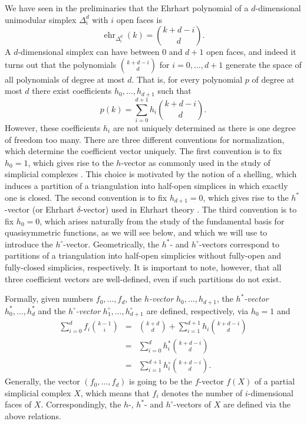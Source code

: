 \documentclass[12pt,reqno]{amsart}
\numberwithin{definition}{section}
\theoremstyle{definition}
\newcommand{\ehr}{\operatorname{ehr}}
\begin{document}
We have seen in the preliminaries that the Ehrhart polynomial of a $d$-dimensional unimodular simplex $\Delta^d_i$ with $i$ open faces is
\[
  \ehr_{\Delta^d_i}(k) = \binom{k+d-i}{d}.
\]
A $d$-dimensional simplex can have between 0 and $d+1$ open faces, and indeed it turns out that the polynomials $\binom{k+d-i}{d}$ for $i=0,\ldots,d+1$ generate the space of all polynomials of degree at most $d$. That is, for every polynomial $p$ of degree at most $d$ there exist coefficients $h_0,\ldots,h_{d+1}$ such that
\[
  p(k) = \sum_{i=0}^{d+1} h_i \binom{k+d-i}{d}.
\] 
However, these coefficients $h_i$ are not uniquely determined as there is one degree of freedom too many. There are three different conventions for normalization, which determine the coefficient vector uniquely. The first convention is to fix $h_0=1$, which gives rise to the $h$-vector as commonly used in the study of simplicial complexes \cite{something}. This choice is motivated by the notion of a shelling, which induces a partition of a triangulation into half-open simplices in which exactly one is closed. The second convention is to fix $h_{d+1}=0$, which gives rise to the $h^*$-vector (or Ehrhart $\delta$-vector) used in Ehrhart theory \cite{something}. The third convention is to fix $h_0=0$, which arises naturally from the study of the fundamental basis for quasisymmetric functions, as we will see below, and which we will use to introduce the $h^\circ$-vector. Geometrically, the $h^*$- and $h^\circ$-vectors correspond to partitions of a triangulation into half-open simplicies without fully-open and fully-closed simplicies, respectively. It is important to note, however, that all three coefficient vectors are well-defined, even if such partitions do not exist.

Formally, given numbers $f_0,\ldots,f_d$, the \emph{$h$-vector} $h_0,\ldots,h_{d+1}$, the \emph{$h^*$-vector} $h^*_0,\ldots,h^*_{d}$ and the \emph{$h^\circ$-vector} $h^\circ_1,\ldots,h^\circ_{d+1}$ are defined, respectively, via $h_0=1$ and
\begin{eqnarray*}
  \sum_{i=0}^{d} f_i \binom{k-1}{i} & = &
  \binom{k+d}{d} + \sum_{i=1}^{d+1} h_i \binom{k+d-i}{d} 
  \\ 
  & = & \sum_{i=0}^{d} h^*_i \binom{k+d-i}{d} \\
    & = & \sum_{i=1}^{d+1} h^\circ_i \binom{k+d-i}{d}.
\end{eqnarray*}
Generally, the vector $(f_0,\ldots,f_d)$ is going to be the $f$-vector $f(X)$ of a partial simplicial complex $X$, which means that $f_i$ denotes the number of $i$-dimensional faces of $X$. Correspondingly, the $h$-, $h^*$- and $h^\circ$-vectors of $X$ are defined via the above relations.
\end{document}
